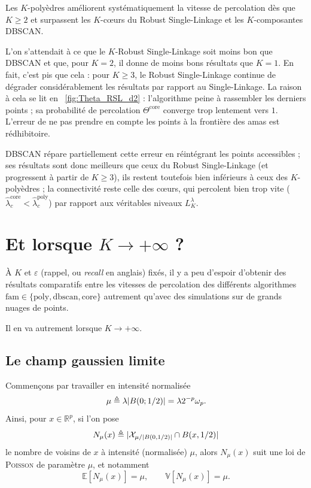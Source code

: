 Les $K$-polyèdres améliorent systématiquement la vitesse de percolation dès que $K\ge2$ et surpassent les $K$-cœurs du Robust Single-Linkage et les $K$-composantes DBSCAN. 

L'on s'attendait à ce que le $K$-Robust Single-Linkage soit moins bon que DBSCAN et que, pour $K=2$, il donne de moins bons résultats que $K=1$. 
En fait, c'est pis que cela : pour $K\ge3$, le Robust Single-Linkage continue de dégrader considérablement les résultats par rapport au Single-Linkage. La raison à cela se lit en \Fig~\ref{fig:Theta_RSL_d2} : l'algorithme peine à rassembler les derniers points ; sa probabilité de percolation $\Theta^{\mathrm{core}}$ converge trop lentement vers $1$. L'erreur de ne pas prendre en compte les points à la frontière des amas est rédhibitoire.

DBSCAN répare partiellement cette erreur en réintégrant les points accessibles ; ses résultats sont donc meilleurs que ceux du Robust Single-Linkage (et progressent à partir de $K \ge3$), ils restent toutefois bien inférieurs à ceux des $K$-polyèdres ; la connectivité reste celle des cœurs, qui percolent bien trop vite ($\hat \lambda_c^{\mathrm{core}} < \hat \lambda_c^{\mathrm{poly}}$) par rapport aux véritables niveaux $L_K^\lambda$.



\section{Et lorsque $K\to+\infty$ ?}
\label{sec:comparaison_asymptotique}

À $K$ et $\varepsilon$ (rappel, ou \emph{recall} en anglais) fixés, il y a peu d'espoir d'obtenir des résultats comparatifs entre les vitesses de percolation des différents algorithmes $\mathrm{fam} \in \bigl\{ \mathrm{poly}, \mathrm{dbscan}, \mathrm{core} \bigr\}$ autrement qu'avec des simulations sur de grands nuages de points.

Il en va autrement lorsque $K \to +\infty$.


\subsection{Le champ gaussien limite}

Commençons par travailler en intensité normalisée
\[
    \mu \triangleq \lambda \lvert B(0;1/2) \rvert  = \lambda 2^{-p}\omega_p .
\]
Ainsi, pour $x\in\mathbb R^p$, si l'on pose
\[
    N_\mu(x)
    \triangleq
    \lvert \mathcal X_{\mu/\lvert B(0,1/2) \rvert}\cap B(x,1/2) \rvert
\]
le nombre de voisins de $x$ à intensité (normalisée) $\mu$, alors $N_\mu(x)$ suit une loi de \textsc{Poisson} de paramètre $\mu$, et notamment
\[
    \mathbb E[N_\mu(x)]=\mu,
    \qquad
    \mathbb V[N_\mu(x)]=\mu.
\]

